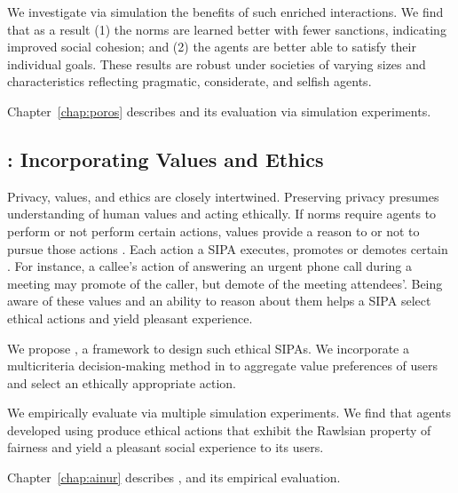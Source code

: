 We investigate via simulation the benefits
of such enriched interactions. We find
that as a result (1) the norms are learned better with
fewer sanctions, indicating improved social cohesion;
and (2) the agents are better able to satisfy
their individual goals. These results are robust under
societies of varying sizes and characteristics reflecting
pragmatic, considerate, and selfish agents.

Chapter~\ref{chap:poros} describes \frameworkB and its 
evaluation via simulation experiments. 

\subsection[Incorporating Values and Ethics]{\frameworkAinur: Incorporating Values and Ethics}
Privacy, values, and ethics are closely intertwined. 
Preserving privacy presumes understanding of human values 
and acting ethically. 
% 
If norms require agents to perform or not perform certain actions,
values provide a reason to or not to pursue those actions
\citep{Dechesne-AIL13-Norms+Values}. Each action a \frameworkB SIPA
executes, promotes or demotes certain 
\citep{pasotti-2016-normas}. For instance, a callee's action of
answering an urgent phone call during a meeting may promote 
of the caller, but demote  of the meeting attendees'. 
Being aware of these values and an ability to reason about them 
helps a SIPA select ethical actions and yield pleasant experience.

We propose \frameworkAinur, a framework to design such ethical SIPAs. We incorporate a multicriteria decision-making method in \frameworkAinur
to aggregate value preferences of users and select an ethically 
appropriate action. 

 
We empirically evaluate \frameworkAinur via multiple simulation 
experiments. We find that agents developed using \frameworkAinur produce ethical actions that exhibit the
Rawlsian property of fairness and yield a pleasant social experience to its users.

Chapter~\ref{chap:ainur} describes \frameworkAinur, and its empirical evaluation. 